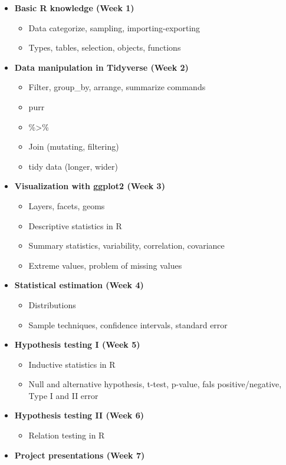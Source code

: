 \documentclass[
]{article}
\providecommand{\tightlist}{%
  \setlength{\itemsep}{0pt}\setlength{\parskip}{0pt}}
\begin{document}
\begin{itemize}
\item
  \textbf{Basic R knowledge (Week 1)}

  \begin{itemize}
  \item
    Data categorize, sampling, importing-exporting
  \item
    Types, tables, selection, objects, functions
  \end{itemize}
\item
  \textbf{Data manipulation in Tidyverse (Week 2)}

  \begin{itemize}
  \item
    Filter, group\_by, arrange, summarize commands
  \item
    purr
  \item
    \%\textgreater\%
  \item
    Join (mutating, filtering)
  \item
    tidy data (longer, wider)
  \end{itemize}
\item
  \textbf{Visualization with ggplot2 (Week 3)}

  \begin{itemize}
  \item
    Layers, facets, geoms
  \item
    Descriptive statistics in R
  \item
    Summary statistics, variability, correlation, covariance
  \item
    Extreme values, problem of missing values
  \end{itemize}
\item
  \textbf{Statistical estimation (Week 4)}

  \begin{itemize}
  \tightlist
  \item
    Distributions
  \item
    Sample techniques, confidence intervals, standard error
  \end{itemize}
\item
  \textbf{Hypothesis testing I (Week 5)}

  \begin{itemize}
  \item
    Inductive statistics in R
  \item
    Null and alternative hypothesis, t-test, p-value, fals
    positive/negative, Type I and II error
  \end{itemize}
\item
  \textbf{Hypothesis testing II (Week 6)}

  \begin{itemize}
  \tightlist
  \item
    Relation testing in R
  \end{itemize}
\item
  \textbf{Project presentations (Week 7)}
\end{itemize}
\end{document}
